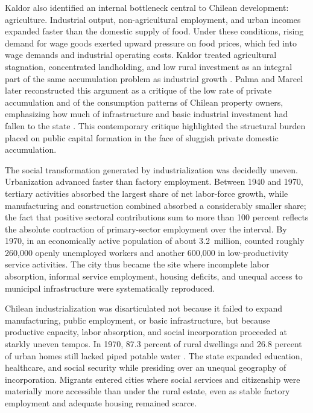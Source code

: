 Kaldor also identified an internal bottleneck central to Chilean development: agriculture. Industrial output, non-agricultural employment, and urban incomes expanded faster than the domestic supply of food. Under these conditions, rising demand for wage goods exerted upward pressure on food prices, which fed into wage demands and industrial operating costs. Kaldor treated agricultural stagnation, concentrated landholding, and low rural investment as an integral part of the same accumulation problem as industrial growth \citep{Kaldor1959}. Palma and Marcel later reconstructed this argument as a critique of the low rate of private accumulation and of the consumption patterns of Chilean property owners, emphasizing how much of infrastructure and basic industrial investment had fallen to the state \citep{PalmaMarcel1989}. This contemporary critique highlighted the structural burden placed on public capital formation in the face of sluggish private domestic accumulation.

The social transformation generated by industrialization was decidedly uneven. Urbanization advanced faster than factory employment. Between 1940 and 1970, tertiary activities absorbed the largest share of net labor-force growth, while manufacturing and construction combined absorbed a considerably smaller share; the fact that positive sectoral contributions sum to more than 100 percent reflects the absolute contraction of primary-sector employment over the interval. By 1970, in an economically active population of about 3.2~million, \citet{DeVylder1976} counted roughly 260,000 openly unemployed workers and another 600,000 in low-productivity service activities. The city thus became the site where incomplete labor absorption, informal service employment, housing deficits, and unequal access to municipal infrastructure were systematically reproduced.

Chilean industrialization was disarticulated not because it failed to expand manufacturing, public employment, or basic infrastructure, but because productive capacity, labor absorption, and social incorporation proceeded at starkly uneven tempos. In 1970, 87.3 percent of rural dwellings and 26.8 percent of urban homes still lacked piped potable water \citep{DeVylder1976}. The state expanded education, healthcare, and social security while presiding over an unequal geography of incorporation. Migrants entered cities where social services and citizenship were materially more accessible than under the rural estate, even as stable factory employment and adequate housing remained scarce.

